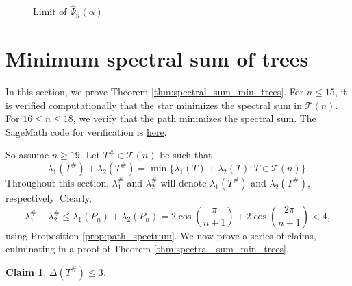 \documentclass[11pt]{article}
\theoremstyle{plain}
\newtheorem{claim}{Claim}[section]
\numberwithin{equation}{section}
\begin{document}
\begin{figure}
\begin{subfigure}{0.5\textwidth}
\end{subfigure}
    \caption{Limit of $\hat{\Psi}_n(\alpha)$}
    \label{fig:Psi_limit_vs_n_26}
\end{figure}

\section{Minimum spectral sum of trees}
\label{section:minimum_spectral_sum}

In this section, we prove Theorem \ref{thm:spectral_sum_min_trees}. For $n\le 15$, it is verified computationally that the star minimizes the spectral sum in $\mathcal{T}(n)$. For $16\le n\le 18$, we verify that the path minimizes the spectral sum. The SageMath code for verification is \href{https://github.com/Shivaramkratos/Codes_misc/blob/main/convex_sum_specific_check.sage}{here}.

So assume $n\ge 19$. Let $T^{\#}\in \mathcal{T}(n)$ be such that \[ \lambda_1(T^{\#}) + \lambda_2(T^{\#}) = \min\{\lambda_1(T) + \lambda_2(T) : T\in \mathcal{T}(n)\}.\]
Throughout this section, $\lambda_1^{\#}$ and $\lambda_2^{\#}$ will denote $\lambda_1(T^{\#})$ and $\lambda_2(T^{\#})$, respectively. Clearly, 
\begin{equation}\label{eq:path_min_spectralsum}
\lambda_1^{\#} + \lambda_2^{\#} \le \lambda_1(P_n) + \lambda_2(P_n) = 2\cos\left(\frac{\pi}{n+1}\right) + 2\cos\left(\frac{2\pi}{n+1}\right)< 4,
\end{equation}
using Proposition \ref{prop:path_spectrum}. We now prove a series of claims, culminating in a proof of Theorem \ref{thm:spectral_sum_min_trees}.

\begin{claim}
    $\Delta(T^{\#})\le 3$.
\end{claim} 
\end{document}
